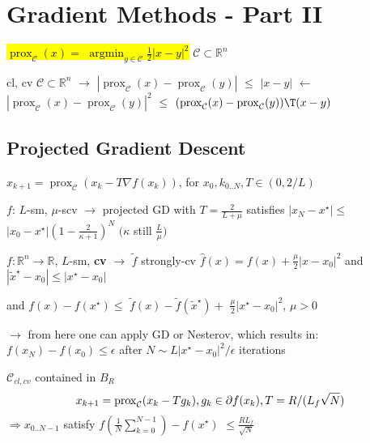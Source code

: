 \section{Gradient Methods - Part II}

\begin{definition}[]

	\textcolor{hltext}{\hl{ $\operatorname{prox}_\mathcal{C}(x)=$
	$\operatorname{argmin}_{y\in\mathcal{C}}\frac{1}{2}|x-y|^2$ }}
	$\mathcal{C}\subset \mathbb{R}^{n}$
\end{definition}

\begin{lemma}
	cl, cv
	$\mathcal{C}\subset \mathbb{R}^{n}$
	$\rightarrow$
	$|\operatorname{prox}_\mathcal{C}(x)-\operatorname{prox}_\mathcal{C}(y)|$
	$\le$
	$|x-y|$
	$\leftarrow$
	$|\operatorname{prox}_\mathcal{C}(x)-\operatorname{prox}_\mathcal{C}(y)|^2$
	$\le$
	$(\operatorname{prox}_\mathcal{C}(x)-\operatorname{prox}_\mathcal{C}(y))\T(x-y)$
\end{lemma}


\subsection{Projected Gradient Descent}

$x_{k+1}=\operatorname{prox}_\mathcal{C}(x_k-T\nabla f(x_k))$,
for $x_0,k_{0..N},T\in(0,2/L)$

\begin{proposition}
	$f$: $L$-sm, $\mu$-scv
	$\rightarrow$
	projected GD with
	$T=\frac{2}{L+\mu}$
	satisfies
	$|x_N - x^\star|\le$
	$|x_0 - x^\star|(1-\frac{2}{\kappa+1})^N$
	$(\kappa$ still $\frac{L}{\mu})$
\end{proposition}

\begin{lemma}
	$f:\mathbb{R}^{n}\rightarrow\mathbb{R}$, $L$-sm, \textbf{cv}
	$\rightarrow$
	$\tilde{f}$
	strongly-cv
	$\hat{f}(x) = f(x)+\frac{\mu}{2}|x-x_0|^2$
	and
	$|\tilde{x}^\star-x_0|\le|x^\star-x_0|$

	and
	$f(x)-f(x^\star)\le$
	$\tilde{f}(x)-\tilde{f}(\tilde{x}^\star)+$
	$\frac{\mu}{2}|x^\star-x_0|^2$,
	$\mu>0$
\end{lemma}

$\rightarrow$ from here one can apply GD or Nesterov, which results in:
$f(x_N)-f(x_0)\le\epsilon$
after
$N\sim L|x^\star-x_0|^2/\epsilon$
iterations

\begin{proposition}
	$\mathcal{C}_{cl,cv}$
	contained in $B_R$
	\vspace{-2mm}
	$$x_{k+1} = \operatorname{prox}_\mathcal{C}(x_k-Tg_k),
		g_k\in\partial f(x_k),
		\vspace{-2mm}
		T = R/(L_f\sqrt{N})$$
	$\Rightarrow x_{0..N-1}$ satisfy
	$f(\frac{1}{N}\sum_{k=0}^{N-1})-f(x^\star)$
	$\le\frac{RL_f}{\sqrt{N}}$
\end{proposition}

